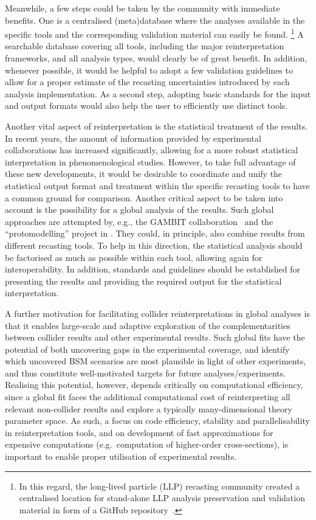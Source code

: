 \documentclass[11pt]{article}
\begin{document}
Meanwhile, a few steps could be taken by the community with immediate benefits. One is a centralised (meta)database where the analyses available in the specific tools and the corresponding validation material can easily be found.%
\footnote{In this regard, the  long-lived particle (LLP) \gls{recasting} community created a centralised location for stand-alone LLP \gls{analysis preservation} and validation material in form of a GitHub repository~\cite{llpRepo}.}
A searchable database covering all tools, including the major reinterpretation frameworks, and all analysis types, would clearly be of great benefit. 
In addition, whenever possible, it would be helpful to adopt a few validation guidelines to allow for a proper estimate of the recasting uncertainties introduced by each analysis implementation.
As a second step, adopting basic standards for the input and output formats would also help the user to efficiently use distinct tools.

Another vital aspect of reinterpretation is the statistical treatment of the results. In recent years, the amount of information provided by experimental collaborations has increased significantly, allowing for a more robust statistical interpretation in phenomenological studies. However, to take full advantage of these new developments, it would be desirable to coordinate and unify the statistical output format and treatment within the specific recasting tools to have a common ground for comparison. Another critical aspect to be taken into account is the possibility for a global analysis of the results. 
Such global approaches are attempted by, e.g., the GAMBIT collaboration~\cite{GAMBIT:2018gjo,Kvellestad:2019vxm} and the ``protomodelling'' project in \cite{Waltenberger:2020ygp}.
They could, in principle, also combine results from different recasting tools.
To help in this direction, the statistical analysis should be factorised as much as possible within each tool, allowing again for interoperability. In addition,  standards and guidelines should be established for presenting the results and providing the required output for the statistical interpretation.

A further motivation for facilitating collider reinterpretations in global analyses is that it enables large-scale and adaptive exploration of the complementarities between collider results and other experimental results. Such global fits have the potential of both uncovering gaps in the experimental coverage, and identify which uncovered \gls{BSM} scenarios are most plausible in light of other experiments, and thus constitute well-motivated targets for future analyses/experiments. Realising this potential, however, depends critically on computational efficiency, since a global fit faces the additional computational cost of reinterpreting all relevant non-collider results and explore a typically many-dimensional theory parameter space. As such, a focus on code efficiency, stability and parallelisability in reinterpretation tools, and on development of fast approximations for expensive computations (e.g.~computation of higher-order cross-sections), is important to enable proper utilisation of experimental results.
\end{document}
